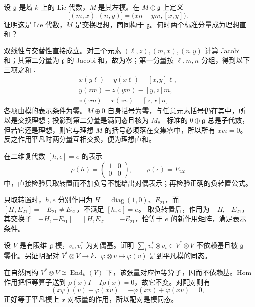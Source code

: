\begin{exercise}\label{b5:ex:11-semidirect-module}
	设 \(\mathfrak g\) 是域 \(k\) 上的 Lie 代数，\(M\) 是其左模。在 \(M\oplus\mathfrak g\) 上定义
	\[
		\bigl[(m,x),(n,y)\bigr]=\bigl(x n-y m,[x,y]\bigr).
	\]
	证明这是 Lie 代数，\(M\) 是交换理想，商同构于 \(\mathfrak g\)。何时两个标准分量成为理想直和？
\end{exercise}
\begin{solution}
	双线性与交替性直接成立。对三个元素 \((\ell,z),(m,x),(n,y)\) 计算 Jacobi 和；其第二分量为 \(\mathfrak g\) 的 Jacobi 和，故为零；第一分量按 \(\ell,m,n\) 分组，得到以下三项之和：
	\[
		\begin{aligned}
			x(y\ell)-y(x\ell)-[x,y]\ell,\\
			y(zm)-z(ym)-[y,z]m,\\
			z(xn)-x(zn)-[z,x]n,
		\end{aligned}
	\]
	各项由模的表示条件为零。\(M\oplus0\) 自身括号为零，与任意元素括号仍在其中，所以是交换理想；投影到第二分量是满同态且核为 \(M\)。 标准的 \(0\oplus\mathfrak g\) 总是子代数，但若它还是理想，则它与理想 \(M\) 的括号必须落在交集零中，所以所有 \(xm=0\)。反之作用平凡时两分量互相交换，便为理想直和。
\end{solution}

\begin{exercise}\label{b5:ex:11-dual-minus-sign}
	在二维复代数 \([h,e]=e\) 的表示
	\[
		\rho(h)=\begin{pmatrix}1&0\\0&0\end{pmatrix},\qquad
		\rho(e)=E_{12}
	\]
	中，直接检验只取转置而不加负号不能给出对偶表示；再检验正确的负转置公式。
\end{exercise}
\begin{solution}
	只取转置时，\(h,e\) 分别作用为 \(H=\operatorname{diag}(1,0)\)、\(E_{21}\)，而 \([H,E_{21}]=-E_{21}\ne E_{21}\)，不满足 \([h,e]=e\)。 取负转置后，作用为 \(-H,-E_{21}\)，其交换子 \([-H,-E_{21}]=[H,E_{21}]=-E_{21}\)，恰等于 \(e\) 的新作用矩阵，满足表示条件。
\end{solution}

\begin{exercise}\label{b5:ex:11-canonical-tensor}
	设 \(V\) 是有限维 \(\mathfrak g\)-模，\(v_i,v_i^*\) 为对偶基。证明 \(\sum_i v_i^*\otimes v_i\in V^*\otimes V\) 不依赖基且被 \(\mathfrak g\) 零化。另证明配对 \(V^*\otimes V\rightarrow k\)、\(\varphi\otimes v\mapsto\varphi(v)\) 是到平凡模的同态。
\end{exercise}
\begin{solution}
	在自然同构 \(V^*\otimes V\cong\operatorname{End}_k(V)\) 下，该张量对应恒等算子，因而不依赖基。Hom 作用把恒等算子送到 \(\rho(x)I-I\rho(x)=0\)，故它不变。对配对则有
	\[
		(x\varphi)(v)+\varphi(xv)=-\varphi(xv)+\varphi(xv)=0,
	\]
	正好等于平凡模上 \(x\) 对标量的作用，所以配对是模同态。
\end{solution}

